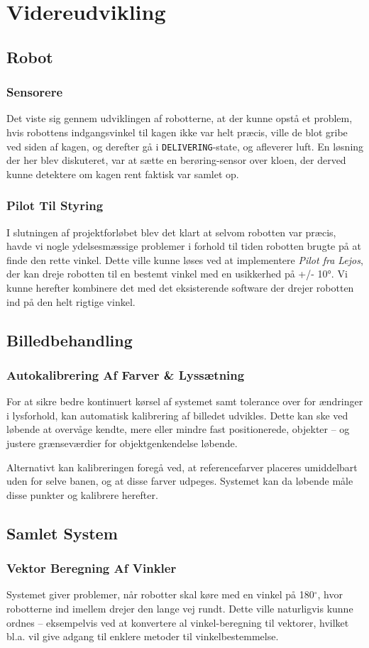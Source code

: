 \chapter{Videreudvikling}
\section{Robot}
\subsection{Sensorere}
Det viste sig gennem udviklingen af robotterne, at der kunne opstå et problem, hvis robottens indgangsvinkel til kagen ikke var helt præcis, ville de blot gribe ved siden af kagen, og derefter gå i \texttt{DELIVERING}-state, og afleverer luft. En løsning der her blev diskuteret, var at sætte en berøring-sensor over kloen, der derved kunne detektere om kagen rent faktisk var samlet op.

\subsection{Pilot Til Styring}
I slutningen af projektforløbet blev det klart at selvom robotten var præcis, havde vi nogle ydelsesmæssige problemer i forhold til tiden robotten brugte på at finde den rette vinkel. Dette ville kunne løses ved at implementere \textit{Pilot fra Lejos}, der kan dreje robotten til en bestemt vinkel med en usikkerhed på +/- 10°. Vi kunne herefter kombinere det med det eksisterende software der drejer robotten ind på den helt rigtige vinkel.

\section{Billedbehandling}
\subsection{Autokalibrering Af Farver \& Lyssætning}
For at sikre bedre kontinuert kørsel af systemet samt tolerance over for ændringer i lysforhold, kan automatisk kalibrering af billedet udvikles. Dette kan ske ved løbende at overvåge kendte, mere eller mindre fast positionerede, objekter -- og justere grænseværdier for objektgenkendelse løbende.

Alternativt kan kalibreringen foregå ved, at referencefarver placeres umiddelbart uden for selve banen, og at disse farver udpeges. Systemet kan da løbende måle disse punkter og kalibrere herefter.

\section{Samlet System}
\subsection{Vektor Beregning Af Vinkler}
Systemet giver problemer, når robotter skal køre med en vinkel på 180$^\circ$, hvor robotterne ind imellem drejer den lange vej rundt. Dette ville naturligvis kunne ordnes -- eksempelvis ved at konvertere al vinkel-beregning til vektorer, hvilket bl.a. vil give adgang til enklere metoder til vinkelbestemmelse.